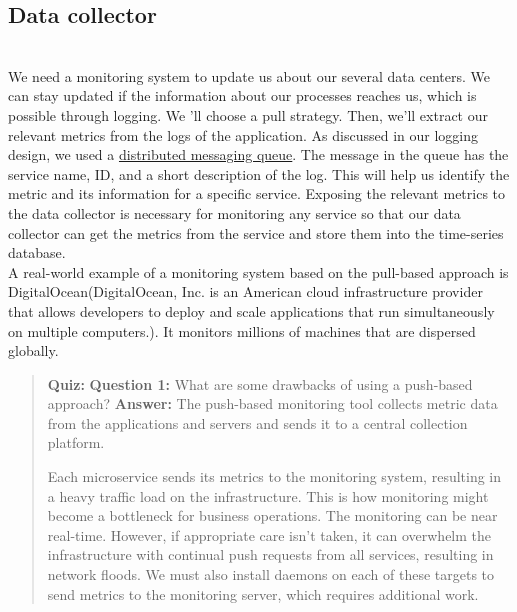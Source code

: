 \subsection{Data collector}\label{JrqjRgxLvxNoVZR-aHGiJ}
\\
We need a monitoring system to update us about our several data centers. We can stay updated if the information about our processes reaches us, which is possible through logging. We 'll choose a pull strategy. Then, we'll extract our relevant metrics from the logs of the application. As discussed in our logging design, we used a \href{https://www.educative.io/courses/grokking-the-system-design-interview/design-of-a-distributed-logging-service\#Using-distributed-messaging-queue}{distributed messaging queue}. The message in the queue has the service name, ID, and a short description of the log. This will help us identify the metric and its information for a specific service. Exposing the relevant metrics to the data collector is necessary for monitoring any service so that our data collector can get the metrics from the service and store them into the time-series database.
\\
A real-world example of a monitoring system based on the pull-based approach is DigitalOcean(DigitalOcean, Inc. is an American cloud infrastructure provider that allows developers to deploy and scale applications that run simultaneously on multiple computers.). It monitors millions of machines that are dispersed globally.

\begin{quote}
\textbf{Quiz:}
\textbf{Question 1:} What are some drawbacks of using a push-based approach?
\textbf{Answer:} The push-based monitoring tool collects metric data from the applications and servers and sends it to a central collection platform.

Each microservice sends its metrics to the monitoring system, resulting in a heavy traffic load on the infrastructure. This is how monitoring might become a bottleneck for business operations. The monitoring can be near real-time. However, if appropriate care isn't taken, it can overwhelm the infrastructure with continual push requests from all services, resulting in network floods. We must also install daemons on each of these targets to send metrics to the monitoring server, which requires additional work.
\end{quote}

